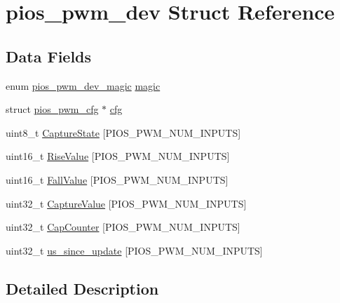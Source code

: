 \hypertarget{structpios__pwm__dev}{\section{pios\-\_\-pwm\-\_\-dev \-Struct \-Reference}
\label{structpios__pwm__dev}
}
\subsection*{\-Data \-Fields}
\begin{DoxyCompactItemize}
\item 
enum \hyperlink{group___p_i_o_s___p_w_m_ga42d376e6bd816a93a35efb03226d676e}{pios\-\_\-pwm\-\_\-dev\-\_\-magic} \hyperlink{structpios__pwm__dev_a30184bc599b287648e5b2430590a2057}{magic}
\item 
struct \hyperlink{structpios__pwm__cfg}{pios\-\_\-pwm\-\_\-cfg} $\ast$ \hyperlink{structpios__pwm__dev_a879902a1111b771fe171269e1db3a537}{cfg}
\item 
uint8\-\_\-t \hyperlink{structpios__pwm__dev_a31387dc44557e705dc17b4a12313b6a5}{\-Capture\-State} \mbox{[}\-P\-I\-O\-S\-\_\-\-P\-W\-M\-\_\-\-N\-U\-M\-\_\-\-I\-N\-P\-U\-T\-S\mbox{]}
\item 
uint16\-\_\-t \hyperlink{structpios__pwm__dev_ab54467e66397e1470fcda91714768c18}{\-Rise\-Value} \mbox{[}\-P\-I\-O\-S\-\_\-\-P\-W\-M\-\_\-\-N\-U\-M\-\_\-\-I\-N\-P\-U\-T\-S\mbox{]}
\item 
uint16\-\_\-t \hyperlink{structpios__pwm__dev_ad3484d9d98fd9b11c7abca2cdd9c9ee0}{\-Fall\-Value} \mbox{[}\-P\-I\-O\-S\-\_\-\-P\-W\-M\-\_\-\-N\-U\-M\-\_\-\-I\-N\-P\-U\-T\-S\mbox{]}
\item 
uint32\-\_\-t \hyperlink{structpios__pwm__dev_a4636d6e2c328194059cdaecd349b117a}{\-Capture\-Value} \mbox{[}\-P\-I\-O\-S\-\_\-\-P\-W\-M\-\_\-\-N\-U\-M\-\_\-\-I\-N\-P\-U\-T\-S\mbox{]}
\item 
uint32\-\_\-t \hyperlink{structpios__pwm__dev_aef85196929d283f9a4925ebd3b353b5f}{\-Cap\-Counter} \mbox{[}\-P\-I\-O\-S\-\_\-\-P\-W\-M\-\_\-\-N\-U\-M\-\_\-\-I\-N\-P\-U\-T\-S\mbox{]}
\item 
uint32\-\_\-t \hyperlink{structpios__pwm__dev_a7a992a8b90e3ff0cfa62b69a5157e34e}{us\-\_\-since\-\_\-update} \mbox{[}\-P\-I\-O\-S\-\_\-\-P\-W\-M\-\_\-\-N\-U\-M\-\_\-\-I\-N\-P\-U\-T\-S\mbox{]}
\end{DoxyCompactItemize}


\subsection{\-Detailed \-Description}


